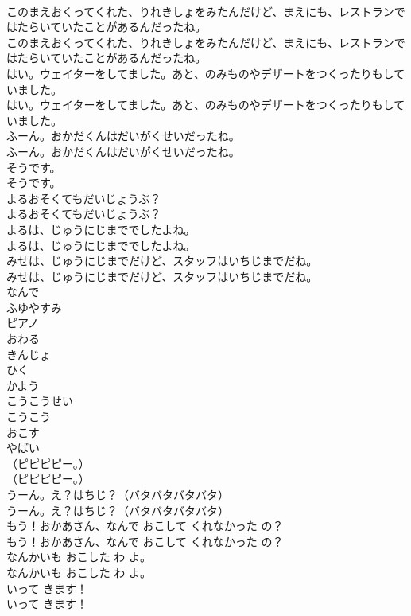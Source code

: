 \documentclass[8pt]{extreport}
\begin{document}
\begin{CJK}{UTF8}{min}
\\	このまえおくってくれた、りれきしょをみたんだけど、まえにも、レストランではたらいていたことがあるんだったね。
\\	このまえおくってくれた、りれきしょをみたんだけど、まえにも、レストランではたらいていたことがあるんだったね。
\\	はい。ウェイターをしてました。あと、のみものやデザートをつくったりもしていました。
\\	はい。ウェイターをしてました。あと、のみものやデザートをつくったりもしていました。
\\	ふーん。おかだくんはだいがくせいだったね。
\\	ふーん。おかだくんはだいがくせいだったね。
\\	そうです。
\\	そうです。
\\	よるおそくてもだいじょうぶ？
\\	よるおそくてもだいじょうぶ？
\\	よるは、じゅうにじまででしたよね。
\\	よるは、じゅうにじまででしたよね。
\\	みせは、じゅうにじまでだけど、スタッフはいちじまでだね。
\\	みせは、じゅうにじまでだけど、スタッフはいちじまでだね。
\\	なんで
\\	ふゆやすみ
\\	ピアノ
\\	おわる
\\	きんじょ
\\	ひく
\\	かよう
\\	こうこうせい
\\	こうこう
\\	おこす
\\	やばい
\\	（ピピピピー。）
\\	（ピピピピー。）
\\	うーん。え？はちじ？（バタバタバタバタ）
\\	うーん。え？はちじ？（バタバタバタバタ）
\\	もう！おかあさん、なんで おこして くれなかった の？
\\	もう！おかあさん、なんで おこして くれなかった の？
\\	なんかいも おこした わ よ。
\\	なんかいも おこした わ よ。
\\	いって きます！
\\	いって きます！

\end{CJK}
\end{document}
